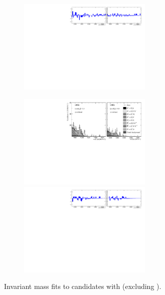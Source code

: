 \begin{figure}[!h]
\begin{subfigure}[t]{1.0\textwidth}
        \includegraphics[width=0.7\textwidth]{figs/Appendix_FitCategories/residuals_DsPhi_Ds2KKPi_both_summed_splitHel_splitKKPi_s21_s21r1_s24_s26.pdf}
    \end{subfigure}
    \begin{subfigure}[t]{1.0\textwidth}
        \centering
        \includegraphics[width=0.7\textwidth]{figs/Appendix_FitCategories/canvas_DsPhiSide_Ds2KKPi_both_summed_splitHel_splitKKPi_s21_s21r1_s24_s26.pdf}\\
        \includegraphics[width=0.7\textwidth]{figs/Appendix_FitCategories/residuals_DsPhiSide_Ds2KKPi_both_summed_splitHel_splitKKPi_s21_s21r1_s24_s26.pdf}
    \end{subfigure}
    \caption{Invariant mass fits to \decay{\Bp}{\Dsp\phiz} candidates with \decay{\Dsp}{\Kp\Km\pip} (excluding \decay{\Dsp}{\phiz\pip}).}
\end{figure}
